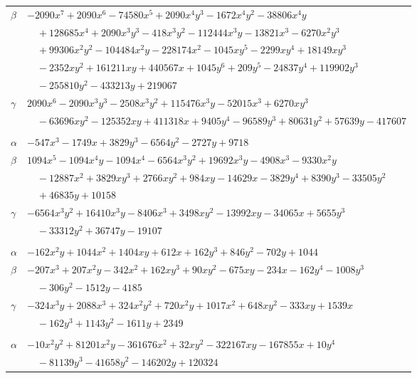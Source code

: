 \documentclass[11pt]{article}
\begin{document}
\begin{longtable}{@{}ll@{}}
$\beta$ & $-2090x^{7}+2090x^{6}-74580x^{5}+2090x^{4}y^{3}-1672x^{4}y^{2}-38806x^{4}y$\\
 & $\quad +128685x^{4}+2090x^{3}y^{3}-418x^{3}y^{2}-112444x^{3}y-13821x^{3}-6270x^{2}y^{3}$\\
 & $\quad +99306x^{2}y^{2}-104484x^{2}y-228174x^{2}-1045xy^{5}-2299xy^{4}+18149xy^{3}$\\
 & $\quad -2352xy^{2}+161211xy+440567x+1045y^{6}+209y^{5}-24837y^{4}+119902y^{3}$\\
 & $\quad -255810y^{2}-433213y+219067$\\
$\gamma$ & $2090x^{6}-2090x^{3}y^{3}-2508x^{3}y^{2}+115476x^{3}y-52015x^{3}+6270xy^{3}$\\
 & $\quad -63696xy^{2}-125352xy+411318x+9405y^{4}-96589y^{3}+80631y^{2}+57639y-417607$\\
\addlinespace[3pt]
\multicolumn{2}{@{}l}{$\{i,j\}=\{3,136\}$, $k_{ij}=2^{4}\cdot 3^{3}\cdot 7\cdot 13$}\\
$\alpha$ & $-547x^{3}-1749x+3829y^{3}-6564y^{2}-2727y+9718$\\
$\beta$ & $1094x^{5}-1094x^{4}y-1094x^{4}-6564x^{3}y^{2}+19692x^{3}y-4908x^{3}-9330x^{2}y$\\
 & $\quad -12887x^{2}+3829xy^{3}+2766xy^{2}+984xy-14629x-3829y^{4}+8390y^{3}-33505y^{2}$\\
 & $\quad +46835y+10158$\\
$\gamma$ & $-6564x^{3}y^{2}+16410x^{3}y-8406x^{3}+3498xy^{2}-13992xy-34065x+5655y^{3}$\\
 & $\quad -33312y^{2}+36747y-19107$\\
\addlinespace[3pt]
\multicolumn{2}{@{}l}{$\{i,j\}=\{3,158\}$, $k_{ij}=2^{4}\cdot 3^{4}$}\\
$\alpha$ & $-162x^{2}y+1044x^{2}+1404xy+612x+162y^{3}+846y^{2}-702y+1044$\\
$\beta$ & $-207x^{3}+207x^{2}y-342x^{2}+162xy^{3}+90xy^{2}-675xy-234x-162y^{4}-1008y^{3}$\\
 & $\quad -306y^{2}-1512y-4185$\\
$\gamma$ & $-324x^{3}y+2088x^{3}+324x^{2}y^{2}+720x^{2}y+1017x^{2}+648xy^{2}-333xy+1539x$\\
 & $\quad -162y^{3}+1143y^{2}-1611y+2349$\\
\addlinespace[3pt]
\multicolumn{2}{@{}l}{$\{i,j\}=\{3,165\}$, $k_{ij}=2^{4}\cdot 3^{3}\cdot 5\cdot 13^{2}$}\\
$\alpha$ & $-10x^{2}y^{2}+81201x^{2}y-361676x^{2}+32xy^{2}-322167xy-167855x+10y^{4}$\\
 & $\quad -81139y^{3}-41658y^{2}-146202y+120324$\\

\end{longtable}
\end{document}
